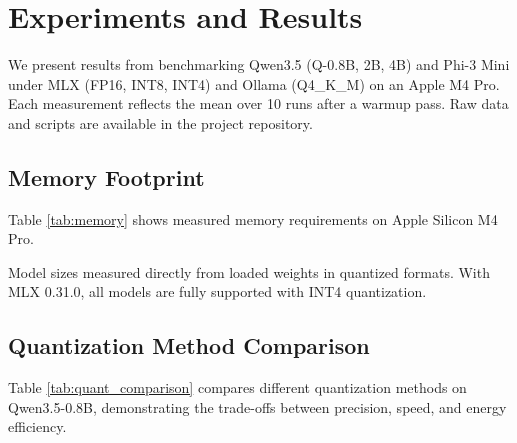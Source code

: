 \documentclass[conference]{IEEEtran}
\begin{document}
\section{Experiments and Results}

We present results from benchmarking Qwen3.5 (Q-0.8B, 2B, 4B) and Phi-3 Mini under MLX (FP16, INT8, INT4) and Ollama (Q4\_K\_M) on an Apple M4 Pro. Each measurement reflects the mean over 10 runs after a warmup pass. Raw data and scripts are available in the project repository.

\subsection{Memory Footprint}

Table \ref{tab:memory} shows measured memory requirements on Apple Silicon M4 Pro.

\begin{table}[t]
\centering
\caption{Model specifications.}
\label{tab:memory}
\end{table}

Model sizes measured directly from loaded weights in quantized formats. With MLX 0.31.0, all models are fully supported with INT4 quantization.

\subsection{Quantization Method Comparison}

Table \ref{tab:quant_comparison} compares different quantization methods on Qwen3.5-0.8B, demonstrating the trade-offs between precision, speed, and energy efficiency.
\end{document}
